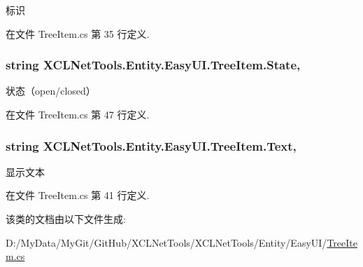 标识 



在文件 Tree\-Item.\-cs 第 35 行定义.

\hypertarget{class_x_c_l_net_tools_1_1_entity_1_1_easy_u_i_1_1_tree_item_a79ad03a5903f54fdd4d60a3206105def}{
\subsubsection[{State}]{\setlength{\rightskip}{0pt plus 5cm}string X\-C\-L\-Net\-Tools.\-Entity.\-Easy\-U\-I.\-Tree\-Item.\-State\hspace{0.3cm}{\ttfamily [get]}, {\ttfamily [set]}}}\label{class_x_c_l_net_tools_1_1_entity_1_1_easy_u_i_1_1_tree_item_a79ad03a5903f54fdd4d60a3206105def}


状态（open/closed） 



在文件 Tree\-Item.\-cs 第 47 行定义.

\hypertarget{class_x_c_l_net_tools_1_1_entity_1_1_easy_u_i_1_1_tree_item_ad85e722c4909d6b93ea2e80e7014ed0c}{
\subsubsection[{Text}]{\setlength{\rightskip}{0pt plus 5cm}string X\-C\-L\-Net\-Tools.\-Entity.\-Easy\-U\-I.\-Tree\-Item.\-Text\hspace{0.3cm}{\ttfamily [get]}, {\ttfamily [set]}}}\label{class_x_c_l_net_tools_1_1_entity_1_1_easy_u_i_1_1_tree_item_ad85e722c4909d6b93ea2e80e7014ed0c}


显示文本 



在文件 Tree\-Item.\-cs 第 41 行定义.



该类的文档由以下文件生成\-:\begin{DoxyCompactItemize}
\item 
D\-:/\-My\-Data/\-My\-Git/\-Git\-Hub/\-X\-C\-L\-Net\-Tools/\-X\-C\-L\-Net\-Tools/\-Entity/\-Easy\-U\-I/\hyperlink{_tree_item_8cs}{Tree\-Item.\-cs}\end{DoxyCompactItemize}
